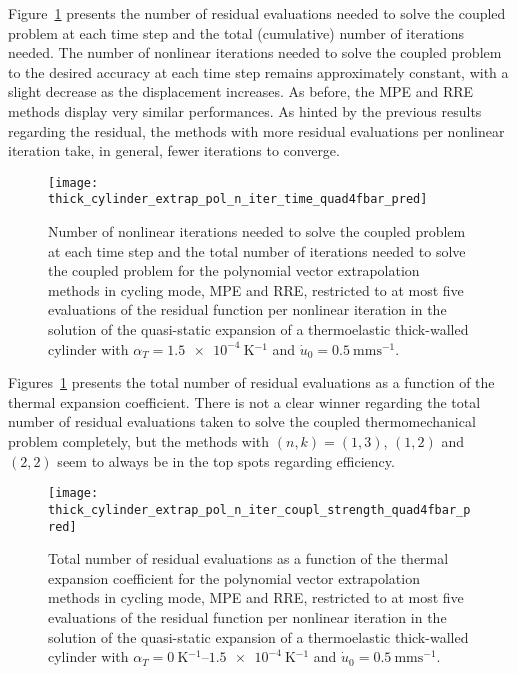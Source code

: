 Figure~\ref{fig:thick_cylinder_extrap_pol_n_iter_time_quad4fbar_pred} presents the number of residual evaluations needed to solve the coupled problem at each time step and the total (cumulative) number of iterations needed.
The number of nonlinear iterations needed to solve the coupled problem to the desired accuracy at each time step remains approximately constant, with a slight decrease as the displacement increases.
As before, the MPE and RRE methods display very similar performances.
As hinted by the previous results regarding the residual, the methods with more residual evaluations per nonlinear iteration take, in general, fewer iterations to converge.

\begin{figure}[htbp]
 \centering
 \texttt{[image: thick\_cylinder\_extrap\_pol\_n\_iter\_time\_quad4fbar\_pred]}
 \caption{Number of nonlinear iterations needed to solve the coupled problem at each time step and the total number of iterations needed to solve the coupled problem for the polynomial vector extrapolation methods in cycling mode, MPE and RRE, restricted to at most five evaluations of the residual function per nonlinear iteration in the solution of the quasi-static expansion of a thermoelastic thick-walled cylinder with \(\alpha_T=\SI{1.5e-4}{\kelvin^{-1}}\) and \(\dot u_0 =\SI{0.5}{\milli\meter\second^{-1}}\).}
\label{fig:thick_cylinder_extrap_pol_n_iter_time_quad4fbar_pred}
\end{figure}

Figures~\ref{fig:thick_cylinder_extrap_pol_n_iter_time_quad4fbar_pred} presents the total number of residual evaluations as a function of the thermal expansion coefficient.
There is not a clear winner regarding the total number of residual evaluations taken to solve the coupled thermomechanical problem completely, but the methods with \((n,k)=(1,3)\), \((1,2)\) and \((2,2)\) seem to always be in the top spots regarding efficiency.

\begin{figure}[htbp]
 \centering
 \texttt{[image: thick\_cylinder\_extrap\_pol\_n\_iter\_coupl\_strength\_quad4fbar\_pred]}
 \caption{Total number of residual evaluations as a function of the thermal expansion coefficient for the polynomial vector extrapolation methods in cycling mode, MPE and RRE, restricted to at most five evaluations of the residual function per nonlinear iteration in the solution of the quasi-static expansion of a thermoelastic thick-walled cylinder with \(\alpha_T=\SIrange{0}{1.5e-4}{\kelvin^{-1}}\) and \(\dot u_0 =\SI{0.5}{\milli\meter\second^{-1}}\).}
\label{fig:thick_cylinder_extrap_pol_n_iter_coupl_strength_quad4fbar_pred}
\end{figure}

